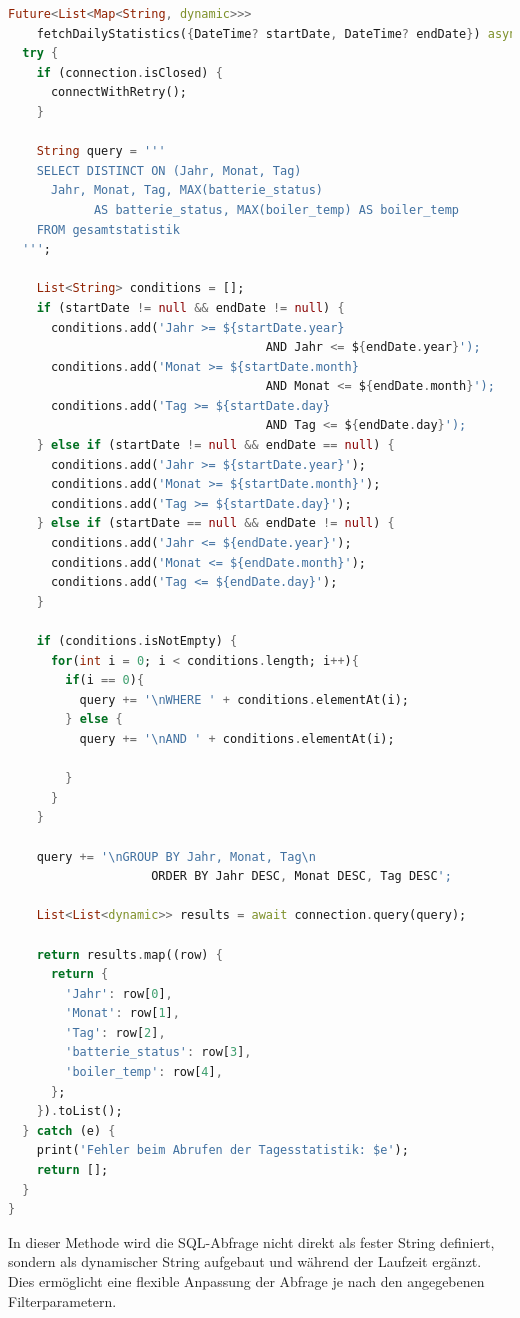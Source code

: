 \documentclass{article}
\begin{document}
    \begin{lstlisting}[language=Dart]
Future<List<Map<String, dynamic>>>
    fetchDailyStatistics({DateTime? startDate, DateTime? endDate}) async {
  try {
    if (connection.isClosed) {
      connectWithRetry();
    }

    String query = '''
    SELECT DISTINCT ON (Jahr, Monat, Tag)
      Jahr, Monat, Tag, MAX(batterie_status)
            AS batterie_status, MAX(boiler_temp) AS boiler_temp
    FROM gesamtstatistik
  ''';

    List<String> conditions = [];
    if (startDate != null && endDate != null) {
      conditions.add('Jahr >= ${startDate.year}
                                    AND Jahr <= ${endDate.year}');
      conditions.add('Monat >= ${startDate.month}
                                    AND Monat <= ${endDate.month}');
      conditions.add('Tag >= ${startDate.day}
                                    AND Tag <= ${endDate.day}');
    } else if (startDate != null && endDate == null) {
      conditions.add('Jahr >= ${startDate.year}');
      conditions.add('Monat >= ${startDate.month}');
      conditions.add('Tag >= ${startDate.day}');
    } else if (startDate == null && endDate != null) {
      conditions.add('Jahr <= ${endDate.year}');
      conditions.add('Monat <= ${endDate.month}');
      conditions.add('Tag <= ${endDate.day}');
    }

    if (conditions.isNotEmpty) {
      for(int i = 0; i < conditions.length; i++){
        if(i == 0){
          query += '\nWHERE ' + conditions.elementAt(i);
        } else {
          query += '\nAND ' + conditions.elementAt(i);

        }
      }
    }

    query += '\nGROUP BY Jahr, Monat, Tag\n
                    ORDER BY Jahr DESC, Monat DESC, Tag DESC';

    List<List<dynamic>> results = await connection.query(query);

    return results.map((row) {
      return {
        'Jahr': row[0],
        'Monat': row[1],
        'Tag': row[2],
        'batterie_status': row[3],
        'boiler_temp': row[4],
      };
    }).toList();
  } catch (e) {
    print('Fehler beim Abrufen der Tagesstatistik: $e');
    return [];
  }
}
    \end{lstlisting}
    In dieser Methode wird die SQL-Abfrage nicht direkt als fester String definiert, sondern als
    dynamischer String aufgebaut und während der Laufzeit ergänzt.
    Dies ermöglicht eine flexible Anpassung der Abfrage je nach den angegebenen Filterparametern.
\end{document}
